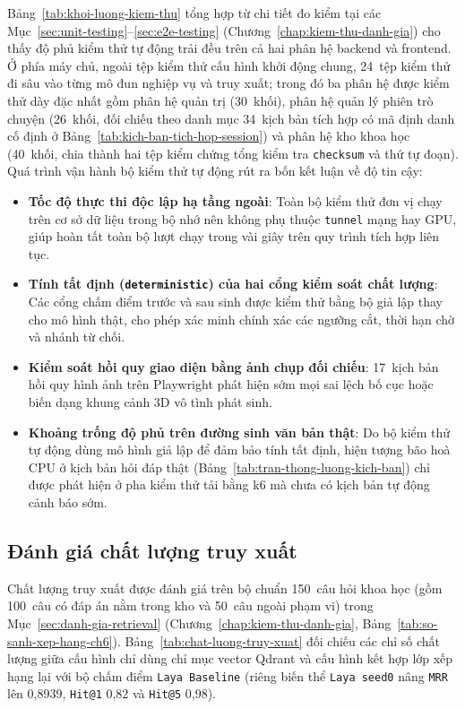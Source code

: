 Bảng~\ref{tab:khoi-luong-kiem-thu} tổng hợp từ chi tiết đo kiểm tại các Mục~\ref{sec:unit-testing}--\ref{sec:e2e-testing} (Chương~\ref{chap:kiem-thu-danh-gia}) cho thấy độ phủ kiểm thử tự động trải đều trên cả hai phân hệ backend và frontend. Ở phía máy chủ, ngoài tệp kiểm thử cấu hình khởi động chung, 24~tệp kiểm thử đi sâu vào từng mô đun nghiệp vụ và truy xuất; trong đó ba phân hệ được kiểm thử dày đặc nhất gồm phân hệ quản trị (30~khối), phân hệ quản lý phiên trò chuyện (26~khối, đối chiếu theo danh mục 34~kịch bản tích hợp có mã định danh cố định ở Bảng~\ref{tab:kich-ban-tich-hop-session}) và phân hệ kho khoa học (40~khối, chia thành hai tệp kiểm chứng tổng kiểm tra \texttt{checksum} và thứ tự đoạn). Quá trình vận hành bộ kiểm thử tự động rút ra bốn kết luận về độ tin cậy:

\begin{itemize}
\item[--] \textbf{Tốc độ thực thi độc lập hạ tầng ngoài}: Toàn bộ kiểm thử đơn vị chạy trên cơ sở dữ liệu trong bộ nhớ nên không phụ thuộc \texttt{tunnel} mạng hay GPU, giúp hoàn tất toàn bộ lượt chạy trong vài giây trên quy trình tích hợp liên tục.
\item[--] \textbf{Tính tất định (\texttt{deterministic}) của hai cổng kiểm soát chất lượng}: Các cổng chấm điểm trước và sau sinh được kiểm thử bằng bộ giả lập thay cho mô hình thật, cho phép xác minh chính xác các ngưỡng cắt, thời hạn chờ và nhánh từ chối.
\item[--] \textbf{Kiểm soát hồi quy giao diện bằng ảnh chụp đối chiếu}: 17~kịch bản hồi quy hình ảnh trên Playwright phát hiện sớm mọi sai lệch bố cục hoặc biến dạng khung cảnh 3D vô tình phát sinh.
\item[--] \textbf{Khoảng trống độ phủ trên đường sinh văn bản thật}: Do bộ kiểm thử tự động dùng mô hình giả lập để đảm bảo tính tất định, hiện tượng bão hoà CPU ở kịch bản hỏi đáp thật (Bảng~\ref{tab:tran-thong-luong-kich-ban}) chỉ được phát hiện ở pha kiểm thử tải bằng k6 mà chưa có kịch bản tự động cảnh báo sớm.
\end{itemize}

\subsection{Đánh giá chất lượng truy xuất}
\label{subsec:danh-gia-chat-luong-truy-xuat}

Chất lượng truy xuất được đánh giá trên bộ chuẩn 150~câu hỏi khoa học (gồm 100~câu có đáp án nằm trong kho và 50~câu ngoài phạm vi) trong Mục~\ref{sec:danh-gia-retrieval} (Chương~\ref{chap:kiem-thu-danh-gia}, Bảng~\ref{tab:so-sanh-xep-hang-ch6}). Bảng~\ref{tab:chat-luong-truy-xuat} đối chiếu các chỉ số chất lượng giữa cấu hình chỉ dùng chỉ mục vector Qdrant và cấu hình kết hợp lớp xếp hạng lại với bộ chấm điểm \texttt{Laya Baseline} (riêng biến thể \texttt{Laya seed0} nâng \texttt{MRR} lên 0,8939, \texttt{Hit@1} 0,82 và \texttt{Hit@5} 0,98).

